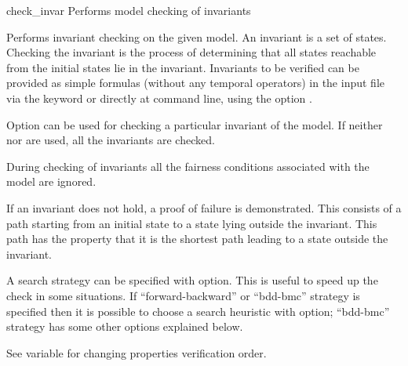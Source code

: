 \begin{nusmvCommand} {check\_invar} {Performs model checking of invariants}
 
 
Performs invariant checking on the given model. An invariant is a set
of states. Checking the invariant is the process of determining that
all states reachable from the initial states lie in the invariant.
Invariants to be verified can be provided as simple formulas (without
any temporal operators) in the input file via the 
keyword or directly at command line, using the option .
   
Option  can be used for checking a particular invariant
of the model. If neither  nor  are used,
all the invariants are checked.
  
During checking of invariants all the fairness conditions associated
with the model are ignored.
  
If an invariant does not hold, a proof of failure is demonstrated.
This consists of a path starting from an initial state to a state
lying outside the invariant. This path has the property that it is the
shortest path leading to a state outside the invariant.

A search strategy can be specified with  option. This is
useful to speed up the check in some situations. If
``forward-backward'' or ``bdd-bmc'' strategy is specified then it is
possible to choose a search heuristic with  option;
``bdd-bmc'' strategy has some other options explained below.

See variable  for changing properties
verification order.
\begin{cmdOpt}

 
            

\end{cmdOpt}
\end{nusmvCommand}
